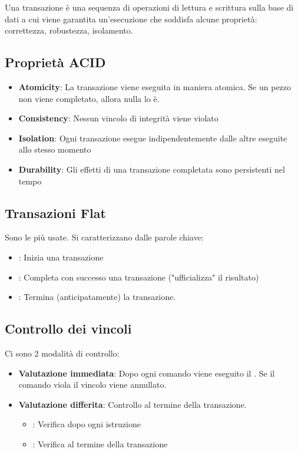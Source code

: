 Una transazione \`e una sequenza di operazioni di lettura e scrittura sulla base di dati a cui viene garantita un’esecuzione che soddisfa alcune proprietà: correttezza, robustezza, isolamento.

\subsection{Proprietà ACID}
\begin{itemize}
    \item \textbf{Atomicity}: La transazione viene eseguita in maniera atomica. Se un pezzo non viene completato, allora nulla lo \`e.
    \item \textbf{Consistency}: Nessun vincolo di integrità viene violato
    \item \textbf{Isolation}: Ogni transazione esegue indipendentemente dalle altre eseguite allo stesso momento
    \item \textbf{Durability}: Gli effetti di una transazione completata sono persistenti nel tempo
\end{itemize}

\subsection{Transazioni Flat}
Sono le più usate. Si caratterizzano dalle parole chiave:
\begin{itemize}
    \item {}: Inizia una transazione
    \item {}: Completa con successo una transazione ("ufficializza" il risultato)
    \item {}: Termina (anticipatamente) la transazione.
\end{itemize}

\subsection{Controllo dei vincoli}
Ci sono 2 modalità di controllo:
\begin{itemize}
    \item \textbf{Valutazione immediata}: Dopo ogni comando viene eseguito il . Se il comando viola il vincolo viene annullato.
    \item \textbf{Valutazione differita}: Controllo al termine della transazione.
    \begin{itemize}
        \item {}: Verifica dopo ogni istruzione
        \item {}: Verifica al termine della transazione
    \end{itemize}
\end{itemize}